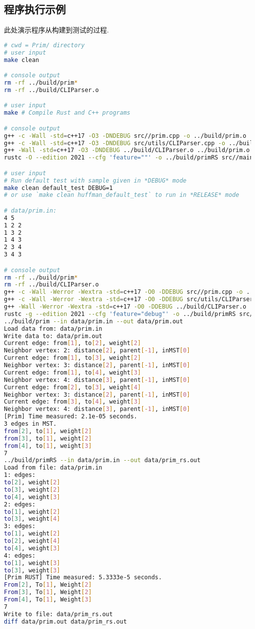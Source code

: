 \subsection{程序执行示例}
此处演示程序从构建到测试的过程.
\begin{lstlisting}[language=bash]
# cwd = Prim/ directory
# user input
make clean

# console output
rm -rf ../build/prim*
rm -rf ../build/CLIParser.o

# user input
make # Compile Rust and C++ programs

# console output
g++ -c -Wall -std=c++17 -O3 -DNDEBUG src//prim.cpp -o ../build/prim.o
g++ -c -Wall -std=c++17 -O3 -DNDEBUG src/utils/CLIParser.cpp -o ../build/CLIParser.o
g++ -Wall -std=c++17 -O3 -DNDEBUG ../build/CLIParser.o ../build/prim.o -o ../build/prim
rustc -O --edition 2021 --cfg 'feature=""' -o ../build/primRS src//main.rs

# user input
# Run default test with sample given in *DEBUG* mode
make clean default_test DEBUG=1
# or use `make clean huffman_default_test` to run in *RELEASE* mode

# data/prim.in:
4 5
1 2 2
1 3 2
1 4 3
2 3 4
3 4 3

# console output
rm -rf ../build/prim*
rm -rf ../build/CLIParser.o
g++ -c -Wall -Werror -Wextra -std=c++17 -O0 -DDEBUG src//prim.cpp -o ../build/prim.o
g++ -c -Wall -Werror -Wextra -std=c++17 -O0 -DDEBUG src/utils/CLIParser.cpp -o ../build/CLIParser.o
g++ -Wall -Werror -Wextra -std=c++17 -O0 -DDEBUG ../build/CLIParser.o ../build/prim.o -o ../build/prim
rustc -g --edition 2021 --cfg 'feature="debug"' -o ../build/primRS src//main.rs
../build/prim --in data/prim.in --out data/prim.out
Load data from: data/prim.in
Write data to: data/prim.out
Current edge: from[1], to[2], weight[2]
Neighbor vertex: 2: distance[2], parent[-1], inMST[0]
Current edge: from[1], to[3], weight[2]
Neighbor vertex: 3: distance[2], parent[-1], inMST[0]
Current edge: from[1], to[4], weight[3]
Neighbor vertex: 4: distance[3], parent[-1], inMST[0]
Current edge: from[2], to[3], weight[4]
Neighbor vertex: 3: distance[2], parent[-1], inMST[0]
Current edge: from[3], to[4], weight[3]
Neighbor vertex: 4: distance[3], parent[-1], inMST[0]
[Prim] Time measured: 2.1e-05 seconds.
3 edges in MST.
from[2], to[1], weight[2]
from[3], to[1], weight[2]
from[4], to[1], weight[3]
7
../build/primRS --in data/prim.in --out data/prim_rs.out
Load from file: data/prim.in
1: edges:
to[2], weight[2]
to[3], weight[2]
to[4], weight[3]
2: edges:
to[1], weight[2]
to[3], weight[4]
3: edges:
to[1], weight[2]
to[2], weight[4]
to[4], weight[3]
4: edges:
to[1], weight[3]
to[3], weight[3]
[Prim RUST] Time measured: 5.3333e-5 seconds.
From[2], To[1], Weight[2]
From[3], To[1], Weight[2]
From[4], To[1], Weight[3]
7
Write to file: data/prim_rs.out
diff data/prim.out data/prim_rs.out


\end{lstlisting}
